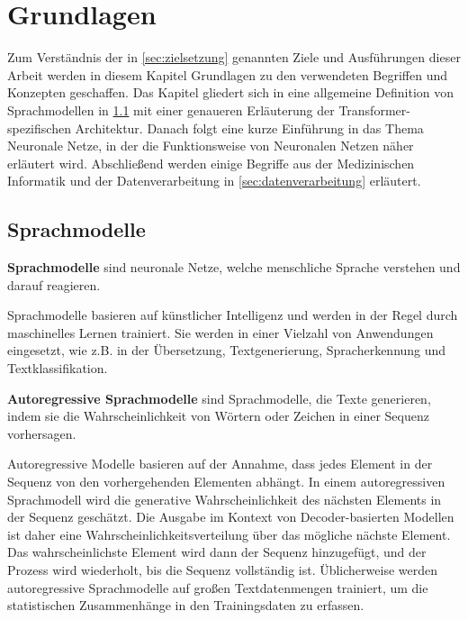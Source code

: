 \chapter{Grundlagen}\label{ch:preliminaries}
Zum Verständnis der in \cref{sec:zielsetzung} genannten Ziele und Ausführungen dieser Arbeit werden in diesem Kapitel Grundlagen zu den verwendeten Begriffen und Konzepten geschaffen.
Das Kapitel gliedert sich in eine allgemeine Definition von Sprachmodellen in \cref{sec:sprachmodelle} mit einer genaueren Erläuterung der Transformer-spezifischen Architektur.
Danach folgt eine kurze Einführung in das Thema Neuronale Netze, in der die Funktionsweise von Neuronalen Netzen näher erläutert wird.
Abschließend werden einige Begriffe aus der Medizinischen Informatik und der Datenverarbeitung in \cref{sec:datenverarbeitung} erläutert.

\section{Sprachmodelle}\label{sec:sprachmodelle}

\begin{definition}\label{def:sprachmodell}
    \textbf{Sprachmodelle} sind neuronale Netze, welche menschliche Sprache verstehen und darauf reagieren.
\end{definition}
Sprachmodelle basieren auf künstlicher Intelligenz und werden in der Regel durch maschinelles Lernen trainiert.
Sie werden in einer Vielzahl von Anwendungen eingesetzt, wie z.B. in der Übersetzung,
Textgenerierung, Spracherkennung und Textklassifikation.

\begin{definition}\label{def:autoregressive-sprachmodelle}
    \textbf{Autoregressive Sprachmodelle} sind Sprachmodelle, die Texte generieren,
    indem sie die Wahrscheinlichkeit von Wörtern oder Zeichen in einer Sequenz vorhersagen.
\end{definition}

Autoregressive Modelle basieren auf der Annahme, dass jedes Element in der Sequenz von den vorhergehenden Elementen abhängt.
In einem autoregressiven Sprachmodell wird die generative Wahrscheinlichkeit des nächsten Elements in der Sequenz geschätzt.
Die Ausgabe im Kontext von Decoder-basierten Modellen ist daher eine Wahrscheinlichkeitsverteilung über das mögliche nächste Element.
Das wahrscheinlichste Element wird dann der Sequenz hinzugefügt, und der Prozess wird wiederholt, bis die Sequenz vollständig ist.
Üblicherweise werden autoregressive Sprachmodelle auf großen Textdatenmengen trainiert, um die statistischen Zusammenhänge in den Trainingsdaten zu erfassen.

